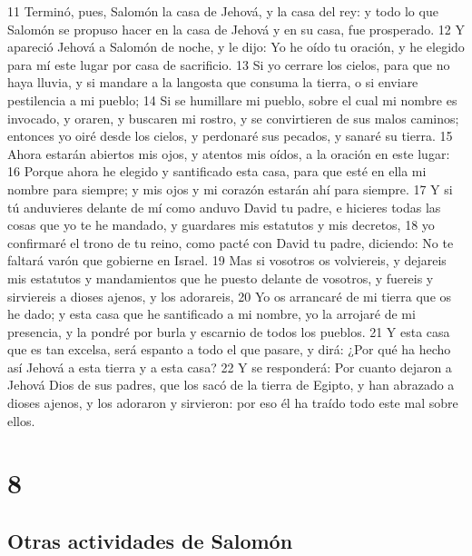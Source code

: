 11 Terminó, pues, Salomón la casa de Jehová, y la casa del rey: y todo lo que Salomón se propuso hacer en la casa de Jehová y en su casa, fue prosperado.
12 Y apareció Jehová a Salomón de noche, y le dijo: Yo he oído tu oración, y he elegido para mí este lugar por casa de sacrificio.
13 Si yo cerrare los cielos, para que no haya lluvia, y si mandare a la langosta que consuma la tierra, o si enviare pestilencia a mi pueblo;
14 Si se humillare mi pueblo, sobre el cual mi nombre es invocado, y oraren, y buscaren mi rostro, y se convirtieren de sus malos caminos; entonces yo oiré desde los cielos, y perdonaré sus pecados, y sanaré su tierra.
15 Ahora estarán abiertos mis ojos, y atentos mis oídos, a la oración en este lugar:
16 Porque ahora he elegido y santificado esta casa, para que esté en ella mi nombre para siempre; y mis ojos y mi corazón estarán ahí para siempre.
17 Y si tú anduvieres delante de mí como anduvo David tu padre, e hicieres todas las cosas que yo te he mandado, y guardares mis estatutos y mis decretos,
18 yo confirmaré el trono de tu reino, como pacté con David tu padre, diciendo: No te faltará varón que gobierne en Israel. 
19 Mas si vosotros os volviereis, y dejareis mis estatutos y mandamientos que he puesto delante de vosotros, y fuereis y sirviereis a dioses ajenos, y los adorareis,
20 Yo os arrancaré de mi tierra que os he dado; y esta casa que he santificado a mi nombre, yo la arrojaré de mi presencia, y la pondré por burla y escarnio de todos los pueblos.
21 Y esta casa que es tan excelsa, será espanto a todo el que pasare, y dirá: ¿Por qué ha hecho así Jehová a esta tierra y a esta casa?
22 Y se responderá: Por cuanto dejaron a Jehová Dios de sus padres, que los sacó de la tierra de Egipto, y han abrazado a dioses ajenos, y los adoraron y sirvieron: por eso él ha traído todo este mal sobre ellos.

\chapter{8}

\section*{Otras actividades de Salomón}

